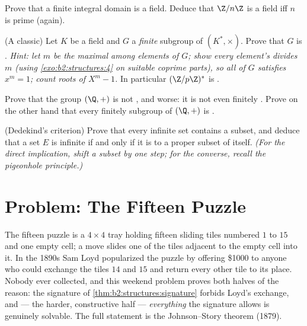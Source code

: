 \begin{exercise}[$\star\star\star$]\label{exo:b2:structures:9}
Prove that a finite integral domain is a field. Deduce that
$\Z/n\Z$ is a field iff $n$ is prime (again).
\end{exercise}

\begin{exercise}[$\star\star\star$]\label{exo:b2:structures:10}
(A classic) Let $K$ be a field and $G$ a \emph{finite} subgroup of
$(K^*, \times)$. Prove that $G$ is .
\emph{Hint: let $m$ be the maximal  among elements of $G$;
show every element's  divides $m$ (using
\cref{exo:b2:structures:4} on suitable coprime parts), so all of $G$
satisfies $x^m = 1$; count roots of $X^m - 1$.}
In particular $(\Z/p\Z)^*$ is .
\end{exercise}

\begin{exercise}[$\star\star\star$]\label{exo:b2:structures:11}
Prove that the group $(\Q, +)$ is not , and worse: it is not
even finitely . Prove on the other hand that every finitely
 subgroup of $(\Q, +)$ is .
\end{exercise}

\begin{exercise}[$\star\star$]\label{exo:b2:structures:12}
(Dedekind's criterion) Prove that every infinite set contains a
 subset, and deduce that a set $E$ is infinite if and only
if it is  to a proper subset of itself. \emph{(For the
direct implication, shift a  subset by one step; for the
converse, recall the pigeonhole principle.)}
\end{exercise}

\section{Problem: The Fifteen Puzzle}

The fifteen puzzle is a $4 \times 4$ tray holding fifteen sliding
tiles numbered $1$ to $15$ and one empty cell; a move slides one of
the tiles adjacent to the empty cell into it. In the 1890s Sam Loyd
popularized the puzzle by offering \$1000 to anyone who could
exchange the tiles $14$ and $15$ and return every other tile to its
place. Nobody ever collected, and this weekend problem proves both
halves of the reason: the signature of
\cref{thm:b2:structures:signature} forbids Loyd's exchange, and
--- the harder, constructive half --- \emph{everything} the
signature allows is genuinely solvable. The full statement is the
Johnson--Story theorem (1879).

